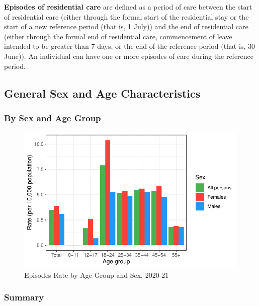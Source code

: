 \documentclass[
  a4paper,
  DIV=11,
  numbers=noendperiod]{scrreport}
\begin{document}
\textbf{Episodes of residential care} are defined as a period of care
between the start of residential care (either through the formal start
of the residential stay or the start of a new reference period (that is,
1 July)) and the end of residential care (either through the formal end
of residential care, commencement of leave intended to be greater than 7
days, or the end of the reference period (that is, 30 June)). An
individual can have one or more episodes of care during the reference
period.

\hypertarget{general-sex-and-age-characteristics}{%
\subsection{General Sex and Age
Characteristics}\label{general-sex-and-age-characteristics}}

\hypertarget{by-sex-and-age-group}{%
\subsubsection{By Sex and Age Group}\label{by-sex-and-age-group}}

\begin{figure}

\caption{\label{fig-rmhc-gsa}Episodes Rate by Age Group and Sex,
2020-21}

{\centering \includegraphics{./chap4-rmhc_files/figure-pdf/fig-rmhc-gsa-1.pdf}

}

\end{figure}

\hypertarget{summary-7}{%
\subsubsection{Summary}\label{summary-7}}
\end{document}
